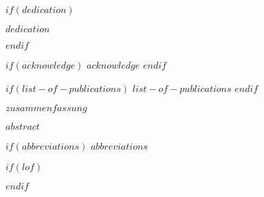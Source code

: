 \documentclass[a4paper,11pt]{article}
\begin{document}
	$if(dedication)$
	\null
	\vspace{5cm}
	\begin{center}
		\textit{$dedication$}
	\end{center}
	\newpage\null\thispagestyle{empty}\newpage
	$endif$
	
	
	$if(acknowledge)$
	\newpage
	$acknowledge$
	$endif$
	\pagestyle{plain}
	\setcounter{page}{1}    %
	\newpage\null\thispagestyle{empty}\newpage
	
	
	$if(list-of-publications)$
	$list-of-publications$
	\newpage\null\thispagestyle{empty}\newpage
	$endif$
	
	
	\begin{justifying}
		
		
		$zusammenfassung$
	
	\end{justifying}
	
	\newpage
	
	
	$abstract$
	\newpage\null\thispagestyle{empty}\newpage
	
	\newpage
	\tableofcontents
	\clearpage
	
	$if(abbreviations)$
	\newpage
	$abbreviations$
	
	$if(lof)$
	\listoffigures
	$endif$
	
\end{document}
